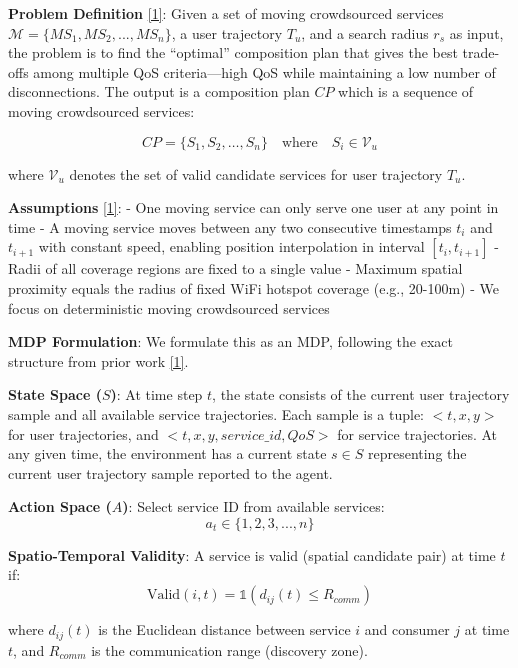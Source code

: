 \textbf{Problem Definition} \hyperlink{cite.neiat2021}{\hyperlink{cite.neiat2021}{[1]}}: Given a set of moving crowdsourced services
\(\mathcal{M} = \{MS_1, MS_2, ..., MS_n\}\), a user trajectory \(T_u\),
and a search radius \(r_s\) as input, the problem is to find the
``optimal'' composition plan that gives the best trade-offs among
multiple QoS criteria---high QoS while maintaining a low number of
disconnections. The output is a composition plan \(CP\) which is a
sequence of moving crowdsourced services:

\begin{equation*}
CP = \{S_1, S_2, \ldots, S_n\} \quad \text{where} \quad S_i \in \mathcal{V}_u
\end{equation*}

\noindent where \(\mathcal{V}_u\) denotes the set of valid candidate
services for user trajectory \(T_u\).

\textbf{Assumptions} \hyperlink{cite.neiat2021}{\hyperlink{cite.neiat2021}{[1]}}: - One moving service can only serve one user at
any point in time - A moving service moves between any two consecutive
timestamps \(t_i\) and \(t_{i+1}\) with constant speed, enabling
position interpolation in interval \([t_i, t_{i+1}]\) - Radii of all
coverage regions are fixed to a single value - Maximum spatial proximity
equals the radius of fixed WiFi hotspot coverage (e.g., 20-100m) - We
focus on deterministic moving crowdsourced services

\textbf{MDP Formulation}: We formulate this as an MDP, following the exact structure from prior work \hyperlink{cite.neiat2021}{\hyperlink{cite.neiat2021}{[1]}}.

\textbf{State Space ($S$)}: At time step $t$, the state consists of the current user trajectory sample and all available service trajectories. Each sample is a tuple: $<t, x, y>$ for user trajectories, and $<t, x, y, service\_id, QoS>$ for service trajectories. At any given time, the environment has a current state $s \in S$ representing the current user trajectory sample reported to the agent.

\textbf{Action Space (\(A\))}: Select service ID from available
services: \[a_t \in \{1, 2, 3, ..., n\}\]

\textbf{Spatio-Temporal Validity}: A service is valid (spatial candidate
pair) at time \(t\) if:
\[\text{Valid}(i, t) = \mathbb{1}(d_{ij}(t) \leq R_{comm})\]

where \(d_{ij}(t)\) is the Euclidean distance between service \(i\) and
consumer \(j\) at time \(t\), and \(R_{comm}\) is the communication
range (discovery zone).

